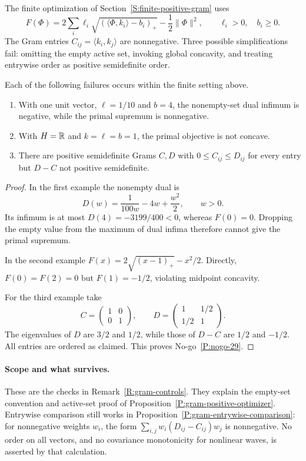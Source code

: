 The finite optimization of Section~\ref{S:finite-positive-gram} uses
\[
  F(\Phi)=2\sum_i\ell_i
  \sqrt{(\langle\Phi,k_i\rangle-b_i)_+}-\frac12\|\Phi\|^2,
  \qquad \ell_i>0,\quad b_i\ge0.
\]
The Gram entries $C_{ij}=\langle k_i,k_j\rangle$ are nonnegative. Three
possible simplifications fail: omitting the empty active set, invoking
global concavity, and treating entrywise order as positive semidefinite order.

\setcounter{nogo}{28}
\begin{nogo}\label{P:nogo-29}
  Each of the following failures occurs within the finite setting above.
  \begin{enumerate}
    \item With one unit vector, $\ell=1/10$ and $b=4$, the nonempty-set
      dual infimum is negative, while the primal supremum is nonnegative.
    \item With $H=\mathbb{R}$ and $k=\ell=b=1$, the primal objective is not concave.
    \item There are positive semidefinite Grams $C,D$ with
      $0\le C_{ij}\le D_{ij}$ for every entry but $D-C$ not positive semidefinite.
  \end{enumerate}
\end{nogo}

\begin{proof}
  In the first example the nonempty dual is
  \[
    D(w)=\frac{1}{100w}-4w+\frac{w^2}{2},\qquad w>0.
  \]
  Its infimum is at most $D(4)=-3199/400<0$, whereas $F(0)=0$.
  Dropping the empty value from the maximum of dual infima therefore cannot
  give the primal supremum.

  In the second example $F(x)=2\sqrt{(x-1)_+}-x^2/2$. Directly,
  $F(0)=F(2)=0$ but $F(1)=-1/2$, violating midpoint concavity.

  For the third example take
  \[
    C=\begin{pmatrix}1&0\\0&1\end{pmatrix},\qquad
    D=\begin{pmatrix}1&1/2\\1/2&1\end{pmatrix}.
  \]
  The eigenvalues of $D$ are $3/2$ and $1/2$, while those of $D-C$ are
  $1/2$ and $-1/2$. All entries are ordered as claimed. This proves
  No-go~\ref{P:nogo-29}.
\end{proof}

\paragraph{Scope and what survives.}
These are the checks in Remark~\ref{R:gram-controls}. They explain the
empty-set convention and active-set proof of
Proposition~\ref{P:gram-positive-optimizer}. Entrywise comparison still
works in Proposition~\ref{P:gram-entrywise-comparison}: for nonnegative
weights $w_i$, the form $\sum_{i,j}w_i(D_{ij}-C_{ij})w_j$ is nonnegative.
No order on all vectors, and no covariance monotonicity for nonlinear waves,
is asserted by that calculation.

